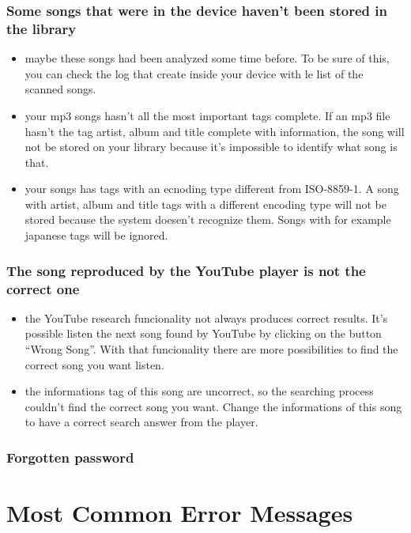 \subsection*{Some songs that were in the device haven't been stored in the
library}
\begin{itemize}
  \item maybe these songs had been analyzed some time before. To be sure of
  this, you can check the log that  create inside your device with
  le list of the scanned songs.
  \item your mp3 songs hasn't all the most important tags complete. If an mp3
  file hasn't the tag artist, album and title complete with information, the
  song will not be stored on your library because it's impossible to identify
  what song is that.
  \item your songs has tags with an ecnoding type different from ISO-8859-1. A
  song with artist, album and title tags with a different encoding type will not
  be stored because the system doesen't recognize them. Songs with for example
  japanese tags will be ignored.
\end{itemize}

\subsection*{The song reproduced by the YouTube player is not the correct one}
\begin{itemize}
  \item the YouTube research funcionality not always produces correct results.
  It's possible listen the next song found by YouTube by clicking on the button
  ``Wrong Song''. With that funcionality there are more possibilities to find
  the correct song you want listen.
  \item the informations tag of this song are uncorrect, so the searching
  process couldn't find the correct song you want. Change the informations of
  this song to have a correct search answer from the player.
\end{itemize}

\subsection*{Forgotten password}

\appendix %
\chapter{Most Common Error Messages}
\thispagestyle{fancy}

